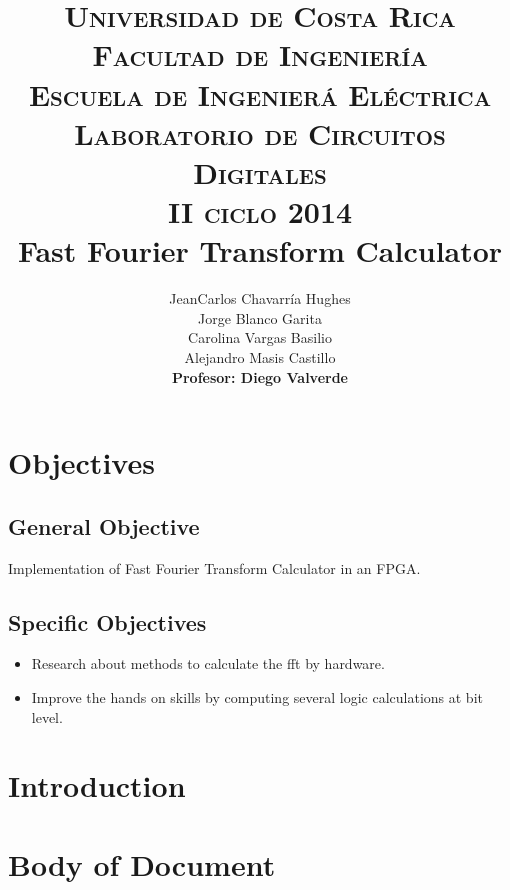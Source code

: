 \documentclass[12pt,letterpaper]{article}     %
\author{JeanCarlos Chavarr\' ia Hughes\\ \small{Jorge Blanco Garita}\\ \small{Carolina Vargas Basilio}\\ \small{Alejandro Masis Castillo}\\ \textbf{Profesor: Diego Valverde}}
\title{\textsc{Universidad de Costa Rica}\\[0.2cm]{\small \textsc{Facultad de Ingenier\' ia}\\[0.5cm] \textsc{Escuela de Ingenier\' a El\' ectrica}\\ \textsc{Laboratorio de Circuitos Digitales}}\\ \textsc{II ciclo 2014}\\ \vspace*{0.55in} Fast Fourier Transform Calculator}
\begin{document}


\maketitle							%
\tableofcontents
\newpage
\listoffigures


\newpage

\section{Objectives}


\subsection{General Objective}
Implementation of Fast Fourier Transform Calculator in an FPGA.

\subsection{Specific Objectives}
\begin{itemize}
\item Research about methods to calculate the fft by hardware.
\item Improve the hands on skills by computing several logic calculations at bit level.
\end{itemize}

\section{Introduction}




\newpage
\section{Body of Document}

\end{document}
